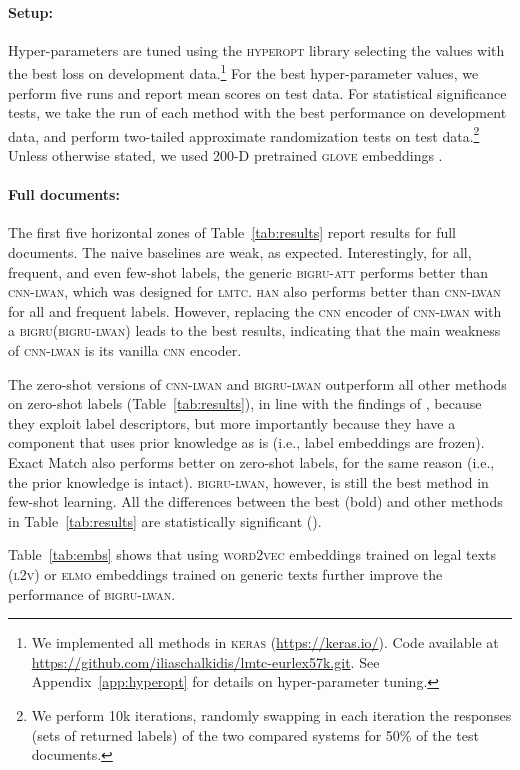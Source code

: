 \documentclass[11pt,a4paper]{article}
\newcommand{\bigruatt}{\textsc{bigru-att}\xspace}
\newcommand{\bigru}{\textsc{bigru}\xspace}
\newcommand{\wordvec}{\textsc{word2vec}\xspace}
\newcommand{\cnn}{\textsc{cnn}\xspace}
\newcommand{\han}{\textsc{han}\xspace}
\newcommand{\lmtc}{\textsc{lmtc}\xspace}
\newcommand{\lwancnn}{\textsc{cnn-lwan}\xspace}
\newcommand{\lwangru}{\textsc{bigru-lwan}\xspace}
\newcommand{\glove}{\textsc{glove}\xspace}
\newcommand{\lawvec}{\textsc{l2v}\xspace}
\newcommand{\elmo}{\textsc{elmo}\xspace}
\begin{document}
\paragraph{Setup:} 
Hyper-parameters are tuned using the \textsc{hyperopt} library selecting the values with the best loss on development data.\footnote{We implemented all methods in \textsc{keras} (\url{https://keras.io/}). Code available at \url{https://github.com/iliaschalkidis/lmtc-eurlex57k.git}. See Appendix~\ref{app:hyperopt} for details on hyper-parameter tuning.} For the best hyper-parameter values, we perform five runs and report mean scores on test data. For statistical significance tests, we take the run of each method with the best performance on development data, and perform two-tailed approximate randomization tests \cite{Dror2018} on test data.\footnote{We perform 10k iterations, randomly swapping in each iteration the responses (sets of returned labels) of the two compared systems for 50\% of the test documents.} Unless otherwise stated, we used 200-D pretrained \glove embeddings \cite{pennington2014glove}.

\paragraph{Full documents:}
\label{sec:overall}
The first five horizontal zones of Table~\ref{tab:results} report results for full documents. The naive baselines are weak, as expected. Interestingly, for all, frequent, and even few-shot labels, the generic \bigruatt performs better than \lwancnn, which was designed for \lmtc. \han also performs better than \lwancnn for all and frequent labels. However, replacing the \cnn encoder of \lwancnn with a \bigru (\lwangru) leads to the best results, indicating that the main weakness of \lwancnn is its vanilla \cnn encoder.

The zero-shot versions of \lwancnn and \lwangru outperform all other  methods on zero-shot labels (Table~\ref{tab:results}), in line with the findings of \citet{Rios2018-2}, because they exploit label descriptors,
but more importantly because they have a component that uses prior knowledge as is (i.e., label embeddings are frozen). Exact Match also performs better on zero-shot labels, for the same reason (i.e., the prior knowledge is intact). \lwangru, however, is still the best method in few-shot learning. All the differences between the best (bold) and other methods in Table~\ref{tab:results} are statistically significant ().

Table~\ref{tab:embs} shows that using \wordvec embeddings trained on legal texts (\lawvec) \cite{Chalkidis2018} or \elmo embeddings \cite{Peters2018} trained on generic texts further improve the performance of \lwangru. 
\end{document}
